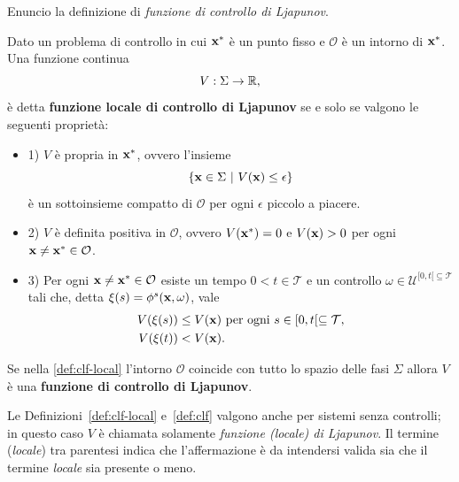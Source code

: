 Enuncio la definizione di \emph{funzione di controllo di Ljapunov}.
\begin{definition}
    \label{def:clf-local}
    Dato un problema di controllo in cui $\mathbf{x}^*$ è un punto fisso e
    $\mathcal O$ è un intorno di $\mathbf{x}^*$.
    Una funzione continua
    \begin{equation*}
        V : \Sigma \to \mathbb{R},
    \end{equation*}
    è detta \textbf{funzione locale di controllo di Ljapunov} se
    e solo se valgono le seguenti proprietà:
    \begin{itemize}
        \item 1) $V$ è propria in $\mathbf{x}^*$, ovvero l'insieme
        \begin{equation*}
            \left\{\mathbf{x} \in \Sigma\ |\ V(\mathbf{x}) \leq \epsilon \right\}
        \end{equation*}
        è un sottoinsieme compatto di $\mathcal O$ per ogni $\epsilon$ piccolo a piacere.
        \item 2) $V$ è definita positiva in $\mathcal O$, ovvero $V(\mathbf{x}^*) = 0$ e
        $V(\mathbf{x}) > 0$ per ogni $\mathbf{x} \neq \mathbf{x}^* \in \mathcal O$.
        \item 3) Per ogni $\mathbf{x} \neq \mathbf{x}^* \in \mathcal O$
        esiste un tempo $0 < t \in \mathcal T$ e un controllo $\omega \in \mathcal U^{[0,t[ \subseteq \mathcal T}$
        tali che, detta $\xi(s) = \phi^s(\mathbf{x}, \omega)$, vale
        \begin{align*}
            V(\xi(s)) &\leq V(\mathbf{x}) \text{ per ogni } s \in [0,t[ \subseteq \mathcal T, \\
            V(\xi(t)) &< V(\mathbf{x}).
        \end{align*}
    \end{itemize}
\end{definition}

\begin{definition}
    Se nella \autoref{def:clf-local} l'intorno $\mathcal O$ coincide
    con tutto lo spazio delle fasi $\Sigma$ allora $V$ è una
    \textbf{funzione di controllo di Ljapunov}.
    \label{def:clf}
\end{definition}

Le Definizioni~\ref{def:clf-local} e~\ref{def:clf} valgono anche per sistemi
senza controlli; in questo caso $V$ è chiamata solamente \emph{funzione (locale) di Ljapunov}.
Il termine (\emph{locale}) tra parentesi indica che l'affermazione è da intendersi valida
sia che il termine \emph{locale} sia presente o meno.

